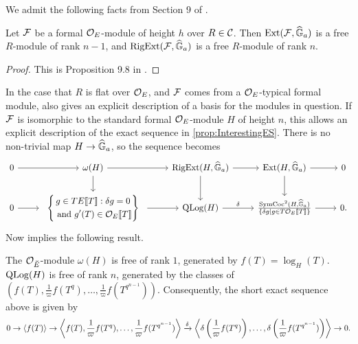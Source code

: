 \documentclass[../main.tex]{subfiles}
\begin{document}
We admit the following facts from Section 9 of \cite{hopkins1994equivariant}.
\begin{prop}\label{prop:InterestingSequenceStdMod}
  Let $\mathcal{F}$ be a formal ${\mathcal{O}_E}$-module of height $h$ over $R \in \mathcal{C}$. 
  Then $\operatorname{Ext}(\mathcal{F}, \widehat{\mathbb{G}}_a)$ is a free $R$-module of rank $n-1$, 
  and $\operatorname {RigExt}(\mathcal{F}, \widehat{\mathbb{G}}_a)$ is a free $R$-module of rank $n$. 
\begin{proof}
  This is Proposition 9.8 in \cite{hopkins1994equivariant}. \end{proof}
\end{prop}

In the case that $R$ is flat over $\mathcal{O}_E$, and $\mathcal{F}$ comes from a 
$\mathcal{O}_E$-typical formal module, \cite[Section 9]{hopkins1994equivariant} also
gives an explicit description of a basis for the modules in question.
If $\mathcal{F}$ is isomorphic to the standard formal $\mathcal{O}_E$-module $H$ of height $n$,
this allows an explicit
description of the exact sequence in \cref{prop:InterestingES}.  
There is no non-trivial map $H \to \widehat{\mathbb{G}}_a$, so the sequence becomes
\begin{equation*}
\begin{tikzcd}[ampersand replacement=\&]
	0 \& {\omega(H)} \& {\RigExt(H,\Ghat_a)} \& {\Ext(H,\Ghat_a)} \& 0 \\
	0 \& \begin{array}{c} \left\{\begin{gathered} {g \in TE\llbr T \rrbr : \delta g = 0} \\          \text{ and $g'(T) \in \cO_E\llbr T \rrbr$}\end{gathered} \right\} \end{array} \& {\QLog(H)} \& {\frac{\SymCoc^2(H, \Ghat_a)}{\{\delta g \mid g \in T \cO_E\llbr T \rrbr\}}} \& 0.
	\arrow[from=1-1, to=1-2]
	\arrow[from=1-2, to=1-3]
	\arrow[from=1-2, to=2-2]
	\arrow[from=1-3, to=1-4]
	\arrow[from=1-3, to=2-3]
	\arrow[from=1-4, to=1-5]
	\arrow[from=1-4, to=2-4]
	\arrow["", from=2-1, to=2-2]
	\arrow[from=2-2, to=2-3]
	\arrow["\delta", from=2-3, to=2-4]
	\arrow[from=2-4, to=2-5]
\end{tikzcd}   
\end{equation*}
Now \cite[Proposition 9.8]{hopkins1994equivariant} implies the following result.
\begin{prop}
  The $\mathcal{O}_{\breve {E}}$-module $\omega(H)$ is free of rank $1$, generated by 
  $f(T) = \log_H(T)$. $\operatorname {QLog}(H)$ is free of rank $n$, generated by the classes of
  $(f(T), \frac 1\varpi f(T^q), \dots, \frac 1\varpi f(T^{q^{n-1}}))$. Consequently,
  the short exact sequence above is given by 
  \begin{equation*}
    0 \to \left \langle f(T) \right \rangle \to \left \langle f(T), \frac 1\varpi
      f(T^q) , \dots,
    \frac 1\varpi f(T^{q^{n-1}}) \right \rangle \xrightarrow{\delta} 
    \left \langle \delta \left(\frac 1\varpi f(T^q)\right),\dots, \delta
    \left(\frac 1\varpi f(T^{q^{n-1}})\right ) \right \rangle \to 0.
  \end{equation*}
\end{prop}
\end{document}
